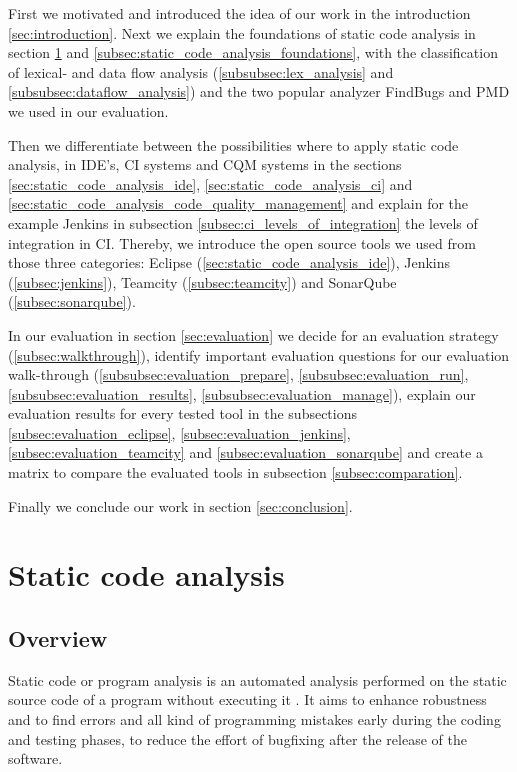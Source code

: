 \documentclass[conference]{IEEEtran}
\begin{document}
First we motivated and introduced the idea of our work in the introduction \ref{sec:introduction}.
Next we explain the foundations of static code analysis in section \ref{sec:static_code_analysis} and \ref{subsec:static_code_analysis_foundations}, with the classification of lexical- and data flow analysis (\ref{subsubsec:lex_analysis} and \ref{subsubsec:dataflow_analysis}) and the two popular analyzer FindBugs and PMD we used in our evaluation.

Then we differentiate between the possibilities where to apply static code analysis, in IDE's, CI systems and CQM systems in the sections \ref{sec:static_code_analysis_ide}, \ref{sec:static_code_analysis_ci} and \ref{sec:static_code_analysis_code_quality_management} and explain for the example Jenkins in subsection \ref{subsec:ci_levels_of_integration} the levels of integration in CI.
Thereby, we introduce the open source tools we used from those three categories: Eclipse (\ref{sec:static_code_analysis_ide}), Jenkins (\ref{subsec:jenkins}), Teamcity (\ref{subsec:teamcity}) and SonarQube (\ref{subsec:sonarqube}).

In our evaluation in section \ref{sec:evaluation} we decide for an evaluation strategy (\ref{subsec:walkthrough}), identify important evaluation questions for our evaluation walk-through (\ref{subsubsec:evaluation_prepare}, \ref{subsubsec:evaluation_run}, \ref{subsubsec:evaluation_results}, \ref{subsubsec:evaluation_manage}), explain our evaluation results for every tested tool in the subsections \ref{subsec:evaluation_eclipse}, \ref{subsec:evaluation_jenkins}, \ref{subsec:evaluation_teamcity} and \ref{subsec:evaluation_sonarqube} and create a matrix to compare the evaluated tools in subsection \ref{subsec:comparation}.

Finally we conclude our work in section \ref{sec:conclusion}.

\section{Static code analysis}
\label{sec:static_code_analysis}
\subsection{Overview}
\label{subsec:static_code_analysis_overview}
Static code or program analysis is an automated analysis performed on the static source code of a program without executing it \cite{Static_Code_Analysis_def}.
It aims to enhance robustness and to find errors and all kind of programming mistakes early during the coding and testing phases, to reduce the effort of bugfixing after the release of the software.
\end{document}
